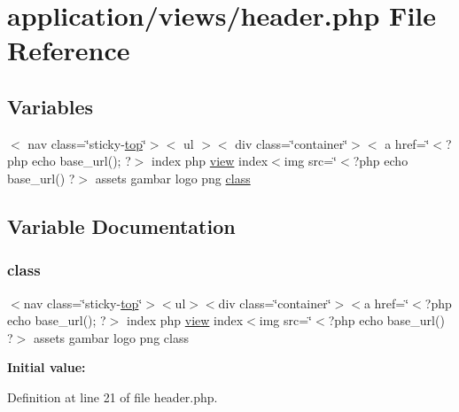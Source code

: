 \hypertarget{header_8php}{}\section{application/views/header.php File Reference}
\label{header_8php}
\subsection*{Variables}
\begin{DoxyCompactItemize}
\item 
$<$ nav class=\char`\"{}sticky-\/\mbox{\hyperlink{wsidebar_8php_a92a4f9c60f5fc724a2e9a4fdb35e9777}{top}}\char`\"{}$>$$<$ ul $>$$<$ div class=\char`\"{}container\char`\"{}$>$$<$ a href=\char`\"{}$<$?php echo base\+\_\+url(); ?$>$ index php \mbox{\hyperlink{wreaduser_8php_a3f75645b356759573f9a6e113f619a48}{view}} index$<$img src=\char`\"{}$<$?php echo base\+\_\+url() ?$>$ assets gambar logo png \mbox{\hyperlink{header_8php_afd4019942a201422552a5ebe997d9a5c}{class}}
\end{DoxyCompactItemize}


\subsection{Variable Documentation}
\mbox{\label{header_8php_afd4019942a201422552a5ebe997d9a5c}} 
\subsubsection{\texorpdfstring{class}{class}}
{\footnotesize\ttfamily $<$nav class=\char`\"{}sticky-\/\mbox{\hyperlink{wsidebar_8php_a92a4f9c60f5fc724a2e9a4fdb35e9777}{top}}\char`\"{}$>$$<$ul$>$$<$div class=\char`\"{}container\char`\"{}$>$$<$a href=\char`\"{}$<$?php echo base\+\_\+url(); ?$>$ index php \mbox{\hyperlink{wreaduser_8php_a3f75645b356759573f9a6e113f619a48}{view}} index$<$img src=\char`\"{}$<$?php echo base\+\_\+url() ?$>$ assets gambar logo png class}

{\bfseries Initial value\+:}
\begin{DoxyCode}{0}

\end{DoxyCode}


Definition at line 21 of file header.\+php.

